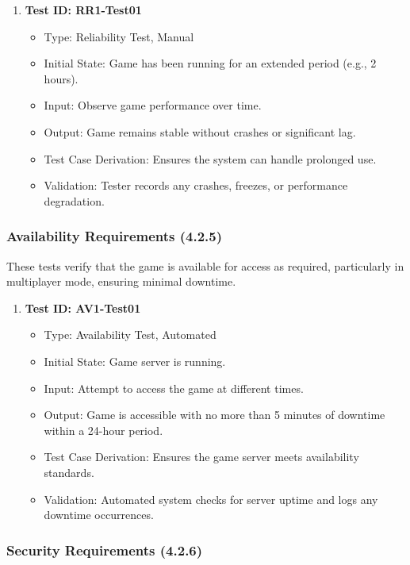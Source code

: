 \documentclass[12pt, titlepage]{article}
\begin{document}
\begin{enumerate}
    \item \textbf{Test ID: RR1-Test01}
        \begin{itemize}
            \item Type: Reliability Test, Manual
            \item Initial State: Game has been running for an extended period (e.g., 2 hours).
            \item Input: Observe game performance over time.
            \item Output: Game remains stable without crashes or significant lag.
            \item Test Case Derivation: Ensures the system can handle prolonged use.
            \item Validation: Tester records any crashes, freezes, or performance degradation.
        \end{itemize}
\end{enumerate}

\subsubsection{Availability Requirements (4.2.5)}

These tests verify that the game is available for access as required, particularly in multiplayer mode, ensuring minimal downtime.

\begin{enumerate}
    \item \textbf{Test ID: AV1-Test01}
        \begin{itemize}
            \item Type: Availability Test, Automated
            \item Initial State: Game server is running.
            \item Input: Attempt to access the game at different times.
            \item Output: Game is accessible with no more than 5 minutes of downtime within a 24-hour period.
            \item Test Case Derivation: Ensures the game server meets availability standards.
            \item Validation: Automated system checks for server uptime and logs any downtime occurrences.
        \end{itemize}
\end{enumerate}

\subsubsection{Security Requirements (4.2.6)}
\end{document}
